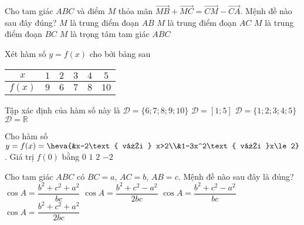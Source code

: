 \begin{ex}%
	Cho tam giác $ABC$ và điểm $M$ thỏa mãn $\overrightarrow{MB}+\overrightarrow{MC}=\overrightarrow{CM}-\overrightarrow{CA}$. Mệnh đề nào sau đây đúng?
	\choice
	{$M$ là trung điểm đoạn $AB$}
	{$M$ là trung điểm đoạn $AC$}
	{$M$ là trung điểm đoạn $BC$}
	{\True $M$ là trọng tâm tam giác $ABC$}
\end{ex}
\begin{ex}%
	Xét hàm số $y=f(x)$ cho bởi bảng sau
	\begin{center}
\begin{tabular}{|c|c|c|c|c|c|}
	\hline
$x$	& $1$ & $2$ & $3$ & $4$ & $5$ \\
	\hline
$f(x)$	& $9$ & $6$ & $7$ & $8$ & $10$ \\
	\hline
\end{tabular}
	\end{center}
Tập xác định của hàm số này là
	\choice
	{$\mathscr{D}=\{6;7;8;9;10\}$}
	{$\mathscr{D}=[1;5]$}
	{\True $\mathscr{D}=\{1;2;3;4;5\}$}
	{$\mathscr{D}=\mathbb{R}$}
\end{ex}
\begin{ex}%
	Cho hàm số $y=f(x)=\heva{&x-2\text{ với } x>2\\&1-3x^2\text{ với }x\le 2}$. Giá trị $f(0)$ bằng
	\choice
	{$0$}
	{\True $1$}
	{$2$}
	{$-2$}
\end{ex}
\begin{ex}%
	Cho tam giác $ABC$ có $BC=a$, $AC=b$, $AB=c$. Mệnh đề nào sau đây là đúng?
	\choice
	{$\cos A=\dfrac{b^2+c^2+a^2}{bc}$}
	{\True $\cos A=\dfrac{b^2+c^2-a^2}{2bc}$}
	{$\cos A=\dfrac{b^2+c^2-a^2}{bc}$}
	{$\cos A=\dfrac{b^2+c^2+a^2}{2bc}$}
\end{ex}
